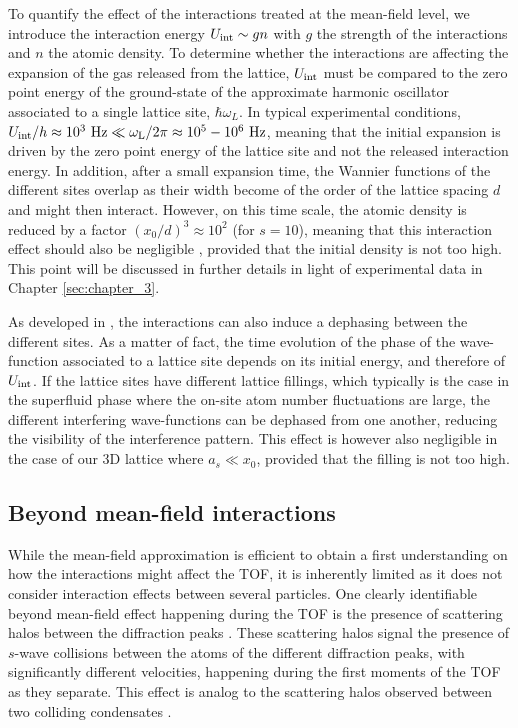 To quantify the effect of the interactions treated at the mean-field level, we introduce the interaction energy $U_{\rm{int}} \sim gn$ with $g$ the strength of the interactions and $n$ the atomic density. To determine whether the interactions are affecting the expansion of the gas released from the lattice, $U_{\rm{int}}$ must be compared to the zero point energy of the ground-state of the approximate harmonic oscillator associated to a single lattice site, $\hbar \omega_L$. In typical experimental conditions, $U_{\rm{int}}/h \approx 10^3 \ \rm{Hz} \ll \omega_L/2 \pi \approx 10^5-10^6 \ \rm{Hz}$, meaning that the initial expansion is driven by the zero point energy of the lattice site and not the released interaction energy. In addition, after a small expansion time, the Wannier functions of the different sites overlap as their width become of the order of the lattice spacing $d$ and might then interact. However, on this time scale, the atomic density is reduced by a factor $(x_0/d)^3 \approx 10^2$ (for $s=10$), meaning that this interaction effect should also be negligible \cite{gerbier2008expansion}, provided that the initial density is not too high. This point will be discussed in further details in light of experimental data in Chapter \ref{sec:chapter_3}.

As developed in \cite{kupferschmidt2010role}, the interactions can also induce a dephasing between the different sites. As a matter of fact, the time evolution of the phase of the wave-function associated to a lattice site depends on its initial energy, and therefore of $U_{\rm{int}}$. If the lattice sites have different lattice fillings, which typically is the case in the superfluid phase where the on-site atom number fluctuations are large, the different interfering wave-functions can be dephased from one another, reducing the visibility of the interference pattern. This effect is however also negligible \cite{gerbier2008expansion,kupferschmidt2010role} in the case of our 3D lattice where $a_s \ll x_0$, provided that the filling is not too high.

\subsection{Beyond mean-field interactions}

While the mean-field approximation is efficient to obtain a first understanding on how the interactions might affect the TOF, it is inherently limited as it does not consider interaction effects between several particles. One clearly identifiable beyond mean-field effect happening during the TOF is the presence of scattering halos between the diffraction peaks \cite{greiner2001exploring}. These scattering halos signal the presence of $s$-wave collisions between the atoms of the different diffraction peaks, \ie with significantly different velocities, happening during the first moments of the TOF as they separate. This effect is analog to the scattering halos observed between two colliding condensates \cite{khakimov2016ghost,perrin2007observation,zin2006elastic}.

